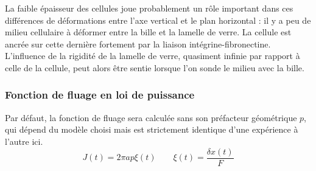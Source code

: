 \documentclass{report}
\begin{document}
La faible épaisseur des cellules joue probablement un rôle important dans ces différences de déformations entre l'axe vertical et le plan horizontal : il y a peu de milieu cellulaire à déformer entre la bille et la lamelle de verre. La cellule est ancrée sur cette dernière fortement par la liaison intégrine-fibronectine. L'influence de la rigidité de la lamelle de verre, quasiment infinie par rapport à celle de la cellule, peut alors être sentie lorsque l'on sonde le milieu avec la bille. 



\subsubsection{Fonction de fluage en loi de puissance}

Par défaut, la fonction de fluage sera calculée sans son préfacteur géométrique $p$, qui dépend du modèle choisi mais est strictement identique d'une expérience à l'autre ici.
$$ J(t) = 2 \pi a p \xi (t)\qquad \xi (t) = \frac{\delta x (t)}{F}$$
	
\end{document}
